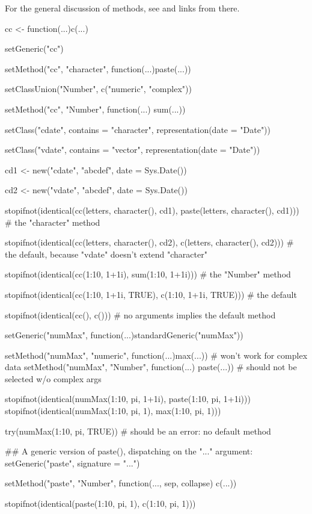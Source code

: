 %
\begin{SeeAlso}\relax
For the general discussion of methods, see   and links
from there.
\end{SeeAlso}
%
\begin{Examples}
\begin{ExampleCode}
cc <- function(...)c(...)

setGeneric("cc")

setMethod("cc", "character", function(...)paste(...))

setClassUnion("Number", c("numeric", "complex"))

setMethod("cc", "Number", function(...) sum(...))

setClass("cdate", contains = "character", representation(date = "Date"))

setClass("vdate", contains = "vector", representation(date = "Date"))

cd1 <- new("cdate", "abcdef", date = Sys.Date())

cd2 <- new("vdate", "abcdef", date = Sys.Date())

stopifnot(identical(cc(letters, character(), cd1),
           paste(letters, character(), cd1))) # the "character" method

stopifnot(identical(cc(letters, character(), cd2),
                    c(letters, character(), cd2)))
# the default, because "vdate" doesn't extend "character"

stopifnot(identical(cc(1:10, 1+1i), sum(1:10, 1+1i))) # the "Number" method

stopifnot(identical(cc(1:10, 1+1i, TRUE), c(1:10, 1+1i, TRUE))) # the default

stopifnot(identical(cc(), c())) # no arguments implies the default method

setGeneric("numMax", function(...)standardGeneric("numMax"))

setMethod("numMax", "numeric", function(...)max(...))
# won't work for complex data
setMethod("numMax", "Number", function(...) paste(...))
# should not be selected w/o complex args

stopifnot(identical(numMax(1:10, pi, 1+1i), paste(1:10, pi, 1+1i)))
stopifnot(identical(numMax(1:10, pi, 1), max(1:10, pi, 1)))

try(numMax(1:10, pi, TRUE)) # should be an error:  no default method

## A generic version of paste(), dispatching on the "..." argument:
setGeneric("paste", signature = "...")

setMethod("paste", "Number", function(..., sep, collapse) c(...))

stopifnot(identical(paste(1:10, pi, 1), c(1:10, pi, 1)))


\end{ExampleCode}
\end{Examples}
